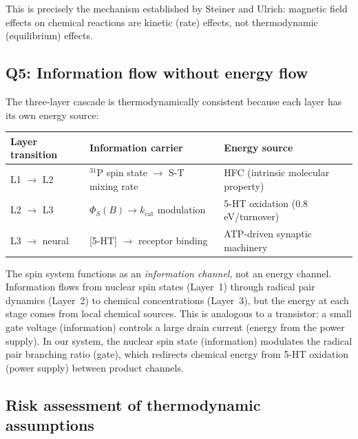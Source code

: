 This is precisely the mechanism established by Steiner and Ulrich\cite{Steiner1989}: magnetic field effects on chemical reactions are kinetic (rate) effects, not thermodynamic (equilibrium) effects.

\subsection{Q5: Information flow without energy flow}

The three-layer cascade is thermodynamically consistent because each layer has its own energy source:

\begin{center}
\begin{tabular}{lll}
\toprule
Layer transition & Information carrier & Energy source \\
\midrule
L1 $\to$ L2 & $^{31}$P spin state $\to$ S-T mixing rate & HFC (intrinsic molecular property) \\
L2 $\to$ L3 & $\Phi_S(B) \to k_\mathrm{cat}$ modulation & 5-HT oxidation (0.8 eV/turnover) \\
L3 $\to$ neural & {[5-HT]} $\to$ receptor binding & ATP-driven synaptic machinery \\
\bottomrule
\end{tabular}
\end{center}

The spin system functions as an \emph{information channel}, not an energy channel. Information flows from nuclear spin states (Layer~1) through radical pair dynamics (Layer~2) to chemical concentrations (Layer~3), but the energy at each stage comes from local chemical sources. This is analogous to a transistor: a small gate voltage (information) controls a large drain current (energy from the power supply). In our system, the nuclear spin state (information) modulates the radical pair branching ratio (gate), which redirects chemical energy from 5-HT oxidation (power supply) between product channels.

\subsection{Risk assessment of thermodynamic assumptions}


